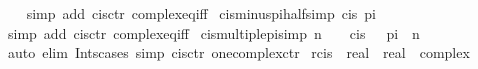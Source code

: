 \begin{isabellebody}
%
\isadelimproof
\ \ %
\endisadelimproof
%
\isatagproof
{}\isamarkupfalse%
\ {\isacharparenleft}{\kern0pt}simp\ add{\isacharcolon}{\kern0pt}\ cis{\isachardot}{\kern0pt}ctr\ complex{\isacharunderscore}{\kern0pt}eq{\isacharunderscore}{\kern0pt}iff{\isacharparenright}{\kern0pt}%
\endisatagproof
{\isafoldproof}%
%
\isadelimproof
\isanewline
%
\endisadelimproof
\isanewline
{}\isamarkupfalse%
\ cis{\isacharunderscore}{\kern0pt}minus{\isacharunderscore}{\kern0pt}pi{\isacharunderscore}{\kern0pt}half{\isacharbrackleft}{\kern0pt}simp{\isacharbrackright}{\kern0pt}{\isacharcolon}{\kern0pt}\ {\isachardoublequoteopen}cis\ {\isacharparenleft}{\kern0pt}{\isacharminus}{\kern0pt}{\isacharparenleft}{\kern0pt}pi\ {\isacharslash}{\kern0pt}\ {}{\isacharparenright}{\kern0pt}{\isacharparenright}{\kern0pt}\ {\isacharequal}{\kern0pt}\ {\isacharminus}{\kern0pt}{\isasymi}{\isachardoublequoteclose}\isanewline
%
\isadelimproof
\ \ %
\endisadelimproof
%
\isatagproof
{}\isamarkupfalse%
\ {\isacharparenleft}{\kern0pt}simp\ add{\isacharcolon}{\kern0pt}\ cis{\isachardot}{\kern0pt}ctr\ complex{\isacharunderscore}{\kern0pt}eq{\isacharunderscore}{\kern0pt}iff{\isacharparenright}{\kern0pt}%
\endisatagproof
{\isafoldproof}%
%
\isadelimproof
\isanewline
%
\endisadelimproof
\isanewline
{}\isamarkupfalse%
\ cis{\isacharunderscore}{\kern0pt}multiple{\isacharunderscore}{\kern0pt}{}pi{\isacharbrackleft}{\kern0pt}simp{\isacharbrackright}{\kern0pt}{\isacharcolon}{\kern0pt}\ {\isachardoublequoteopen}n\ {\isasymin}\ {\isasymint}\ {\isasymLongrightarrow}\ cis\ {\isacharparenleft}{\kern0pt}{}\ {\isacharasterisk}{\kern0pt}\ pi\ {\isacharasterisk}{\kern0pt}\ n{\isacharparenright}{\kern0pt}\ {\isacharequal}{\kern0pt}\ {}{\isachardoublequoteclose}\isanewline
%
\isadelimproof
\ \ %
\endisadelimproof
%
\isatagproof
{}\isamarkupfalse%
\ {\isacharparenleft}{\kern0pt}auto\ elim{\isacharbang}{\kern0pt}{\isacharcolon}{\kern0pt}\ Ints{\isacharunderscore}{\kern0pt}cases\ simp{\isacharcolon}{\kern0pt}\ cis{\isachardot}{\kern0pt}ctr\ one{\isacharunderscore}{\kern0pt}complex{\isachardot}{\kern0pt}ctr{\isacharparenright}{\kern0pt}%
\endisatagproof
{\isafoldproof}%
%
\isadelimproof
%
\endisadelimproof
%
\isadelimdocument
%
\endisadelimdocument
%
\isatagdocument
%
\isamarkuptrue%
%
\endisatagdocument
{\isafolddocument}%
%
\isadelimdocument
%
\endisadelimdocument
{}\isamarkupfalse%
\ rcis\ {\isacharcolon}{\kern0pt}{\isacharcolon}{\kern0pt}\ {\isachardoublequoteopen}real\ {\isasymRightarrow}\ real\ {\isasymRightarrow}\ complex{\isachardoublequoteclose}\isanewline

\end{isabellebody}
